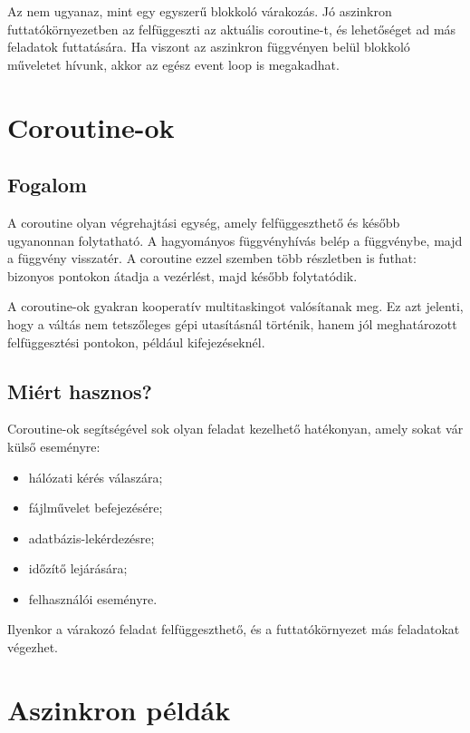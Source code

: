 \begin{warningbox}
Az  nem ugyanaz, mint egy egyszerű blokkoló várakozás. Jó aszinkron futtatókörnyezetben az  felfüggeszti az aktuális coroutine-t, és lehetőséget ad más feladatok futtatására. Ha viszont az aszinkron függvényen belül blokkoló műveletet hívunk, akkor az egész event loop is megakadhat.
\end{warningbox}

\section{Coroutine-ok}

\subsection{Fogalom}

A coroutine olyan végrehajtási egység, amely felfüggeszthető és később ugyanonnan folytatható. A hagyományos függvényhívás belép a függvénybe, majd a függvény visszatér. A coroutine ezzel szemben több részletben is futhat: bizonyos pontokon átadja a vezérlést, majd később folytatódik.

A coroutine-ok gyakran kooperatív multitaskingot valósítanak meg. Ez azt jelenti, hogy a váltás nem tetszőleges gépi utasításnál történik, hanem jól meghatározott felfüggesztési pontokon, például  kifejezéseknél.

\subsection{Miért hasznos?}

Coroutine-ok segítségével sok olyan feladat kezelhető hatékonyan, amely sokat vár külső eseményre:

\begin{itemize}
  \item hálózati kérés válaszára;
  \item fájlművelet befejezésére;
  \item adatbázis-lekérdezésre;
  \item időzítő lejárására;
  \item felhasználói eseményre.
\end{itemize}

Ilyenkor a várakozó feladat felfüggeszthető, és a futtatókörnyezet más feladatokat végezhet.

\section{Aszinkron példák}

